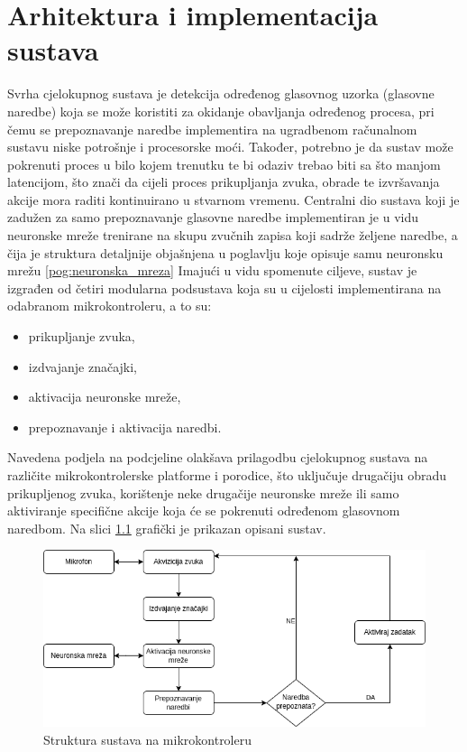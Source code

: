 \chapter{Arhitektura i implementacija sustava}
\label{pog:struktura_sustava}

Svrha cjelokupnog sustava je detekcija određenog glasovnog uzorka (glasovne naredbe) koja se može koristiti za okidanje obavljanja određenog procesa, pri čemu se prepoznavanje naredbe implementira na ugradbenom računalnom sustavu niske potrošnje i procesorske moći. Također, potrebno je da sustav može pokrenuti
proces u bilo kojem trenutku te bi odaziv trebao biti sa što manjom latencijom, što
znači da cijeli proces prikupljanja zvuka, obrade te izvršavanja akcije mora raditi
kontinuirano u stvarnom vremenu. Centralni dio sustava koji je zadužen za
samo prepoznavanje glasovne naredbe implementiran je u vidu neuronske
mreže trenirane na skupu zvučnih zapisa koji sadrže željene naredbe, a čija je struktura
detaljnije objašnjena u poglavlju koje opisuje samu neuronsku mrežu \ref{pog:neuronska_mreza}
Imajući u vidu spomenute ciljeve, sustav je izgrađen od četiri modularna
podsustava koja su u cijelosti implementirana na odabranom mikrokontroleru, a to su:

\begin{itemize}
    \item prikupljanje zvuka,
    \item izdvajanje značajki,
    \item aktivacija neuronske mreže,
    \item prepoznavanje i aktivacija naredbi.
\end{itemize}

Navedena podjela na podcjeline olakšava prilagodbu cjelokupnog
sustava na različite mikrokontrolerske platforme i porodice, što uključuje drugačiju obradu
prikupljenog zvuka, korištenje neke drugačije neuronske mreže ili samo 
aktiviranje specifične akcije koja će se pokrenuti određenom glasovnom naredbom.
Na slici \ref{pic:struktura_sustava} grafički je prikazan opisani sustav.

\begin{figure}[htb]
    \centering
    \includegraphics[width=1\linewidth]{Chapters/struktura_sustava/struktura_sustava.png} 
    \caption{Struktura sustava na mikrokontroleru\cite{flowchart}}
    \label{pic:struktura_sustava}
\end{figure}






